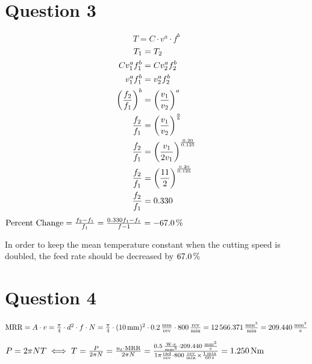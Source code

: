 \documentclass[11pt,letterpaper]{article}
\begin{document}
\section*{Question 3}

$$T = C \cdot v^a \cdot f^b$$
\edef\fChange{\fpeval{(1/2)^(0.20/0.125)}}
\begin{align*}
    T_1 &= T_2\\
    Cv_1^a f_1^b &= C v_2^a f_2^b\\
    v_1^a f_1^b &= v_2^a f_2^b\\
    \left(\frac{f_2}{f_1}\right)^b &= \left(\frac{v_1}{v_2}\right)^a\\
    \frac{f_2}{f_1} &= \left(\frac{v_1}{v_2}\right)^\frac{a}{b}\\
    \frac{f_2}{f_1} &= \left(\frac{v_1}{2v_1}\right)^\frac{0.20}{0.125}\\
    \frac{f_2}{f_1} &= \left(\frac{11}{2}\right)^\frac{0.20}{0.125}\\
    \frac{f_2}{f_1} &= \qty[round-mode=places, round-precision=3]{\fChange}{}
\end{align*}
\edef\percentf{\fpeval{(\fChange - 1) * 100}}
$ \text{Percent Change} = \frac{f_2 - f_1}{f_1} = \frac{\qty[round-mode=places, round-precision=3]{\fChange}{}f_1 - f_1}{f-1} = \qty[round-mode=places, round-precision=1]{\percentf}{\%}$

In order to keep the mean temperature constant when the cutting speed is doubled, the feed rate should be decreased by $\qty[round-mode=places, round-precision=1]{\fpeval{-\percentf}}{\%}$
\clearpage

\section*{Question 4}


\edef\MRRmin{\fpeval{pi/4 * 10^2 *0.2 * 800}}
\edef\MRR{\fpeval{\MRRmin/60}}
$ \text{MRR} = A \cdot v = \frac{\pi}{4} \cdot d^2 \cdot f \cdot N = \frac{\pi}{4} \cdot (\qty{10}{mm})^2 \cdot \qty{0.2}{\frac{mm}{rev}} \cdot \qty{800}{\frac{rev}{min}} = \qty[round-mode=places, round-precision=3]{\MRRmin}{\frac{mm^3}{min}} = \qty[round-mode=places, round-precision=3]{\MRR}{\frac{mm^3}{s}}$


\edef\Torque{\fpeval{0.5 * \MRR / (2 * pi * 800 / 60)}}
$ P = 2 \pi N T \iff T = \frac{P}{2 \pi N} = \frac{u_t \cdot \text{MRR}}{2 \pi N} = \frac{\qty{0.5}{\frac{W \cdot s}{mm^3}} \cdot \qty[round-mode=places, round-precision=3]{\MRR}{\frac{mm^3}{s}}}{1 \pi \qty{}{\frac{rad}{rev}} \cdot \qty{800}{\frac{rev}{min}} \times \frac{\qty{1}{min}}{\qty{60}{s}}} = \qty[round-mode=places, round-precision=3]{\Torque}{Nm}$
\end{document}
